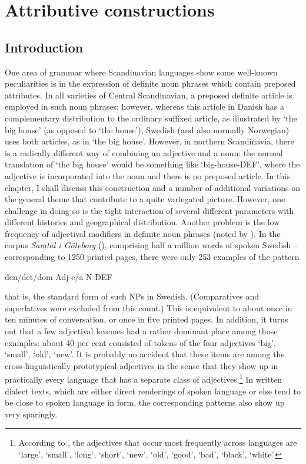 \newcommand{\textcyrillic}{}
\chapter{Attributive constructions}
\section{Introduction}
\label{bkm:Ref262028996}

One area of grammar where Scandinavian languages show some well-known peculiarities is in the expression of definite noun phrases which contain preposed attributes. In all varieties of Central Scandinavian, a preposed definite article is employed in such noun phrases; however, whereas this article in Danish has a complementary distribution to the ordinary suffixed article, as illustrated by  ‘the big house’ (as opposed to  ‘the house’), Swedish (and also normally Norwegian) uses both articles, as in  ‘the big house’. However, in northern Scandinavia, there is a radically different way of combining an adjective and a noun: the normal translation of ‘the big house’ would be something like  ‘big-house-DEF’, where the adjective is incorporated into the noun and there is no preposed article. In this chapter, I shall discuss this construction and a number of additional variations on the general theme that contribute to a quite variegated picture. However, one challenge in doing so is the tight interaction of several different parameters with different histories and geographical distribution. Another problem is the low frequency of adjectival modifiers in definite noun phrases (noted by \citet{Thompson1988}). In the corpus \textit{Samtal i Göteborg }(\citet{Löfström1988}), comprising half a million words of spoken Swedish – corresponding to 1250 printed pages, there were only 253 examples of the pattern

\ea 
\gl den/det/dom Adj-e/a N-DEF
\z 

that is, the standard form of such NPs in Swedish. (Comparatives and superlatives were excluded from this count.) This is equivalent to about once in ten minutes of conversation, or once in five printed pages. In addition, it turns out that a few adjectival lexemes had a rather dominant place among those examples: about 40 per cent consisted of tokens of the four adjectives ‘big’,  ‘small’,  ‘old’,  ‘new’. It is probably no accident that these items are among the cross-linguistically prototypical adjectives in the sense that they show up in practically every language that has a separate class of adjectives.\footnote{\label{fnt:ftn36} According to \citet{Dixon1977}, the adjectives that occur most frequently across languages are ‘large’, ‘small’, ‘long’, ‘short’, ‘new’, ‘old’, ‘good’, ‘bad’, ‘black’, ‘white’.} In written dialect texts, which are either direct renderings of spoken language or else tend to be close to spoken language in form, the corresponding patterns also show up very sparingly.


